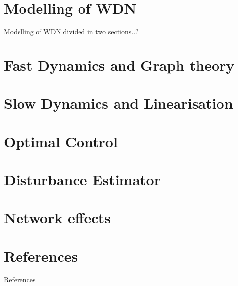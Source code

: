 \documentclass[10pt]{beamer}
\begin{document}

\section{Modelling of WDN}

\begin{frame}{Modelling of WDN}
	divided in two sections..?
\end{frame}
\section{Fast Dynamics and Graph theory}
%
%
\section{Slow Dynamics and Linearisation}

%
%

\section{Optimal Control}


\section{Disturbance Estimator}

%
\section{Network effects}

%
%



















\section{References}
\begin{frame}{References}
	
	
\end{frame}

{\aauwavesbg
\begin{frame}
\end{frame}}
\end{document}
